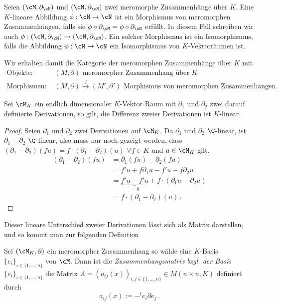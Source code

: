 \begin{defn}
Seien $(\cM,\partial_\cM)$ und $(\cN,\partial_\cN)$ zwei meromorphe
Zusammenhänge über $K$. Eine $K$-lineare Abbildung $\phi:\cM\rightarrow\cN$
ist ein Morphismus von meromorphen Zusammenhängen, falls sie
$\phi\circ\partial_\cM=\phi\circ\partial_\cN$ erfüllt. In diesem Fall
schreiben wir auch $\phi:(\cM,\partial_\cM)\rightarrow(\cN,\partial_\cN)$.
Ein solcher Morphismus ist ein Isomorphismus, falls die Abbildung
$\phi:\cM\rightarrow\cN$ ein Isomorphismus von $K$-Vektorräumen ist.
\end{defn}

\begin{comment}
TODO: entfernen
\end{comment}
\begin{defn}
Wir erhalten damit die Kategorie der meromorphen Zusammenhänge über $K$ mit
\begin{align*}
\text{Objekte: } & (M,\partial)\text{ meromorpher Zusammenhang über }K
\\\text{Morphismen: } & (M,\partial)\overset{f}{\rightarrow}(M',\partial')
  \text{ Morphismus von meromorphen Zusammenhängen.}
\end{align*}
\end{defn}

\begin{lem} Sei $\cM_K$ ein endlich dimensionaler $K$-Vektor Raum mit
$\partial_1$ und $\partial_2$ zwei darauf definierte Derivationen, so gilt, die
Differenz zweier Derivationen ist $K$-linear.
\end{lem}
\begin{proof}
Seien $\partial_1$ und $\partial_2$ zwei Derivationen auf $\cM_K$.
Da $\partial_1$ und $\partial_2$ $\C$-linear, ist $\partial_1-\partial_2$
$\C$-linear, also muss nur noch gezeigt werden, dass
$(\partial_1-\partial_2)(fu)=f\cdot(\partial_1-\partial_2)(u)$ $\forall f\in
K$ und $u\in\cM_K$ gilt.\\
\begin{align*}
(\partial_1-\partial_2)(fu) &= \partial_1(fu)-\partial_2(fu)\\
&= f'u+f\partial_1u-f'u-f\partial_2u\\
&= \underset{=0}{\underbrace{f'u-f'u}}+f\cdot(\partial_1u-\partial_2u)\\
&= f\cdot(\partial_1-\partial_2)(u) \,.
\end{align*}
\end{proof}
Dieser lineare Unterschied zweier Derivationen lässt sich als Matrix
darstellen, und so kommt man zur folgenden Definition
\begin{comment}
\cite[Seite 129]{hotta2007d}
\end{comment}
\begin{defn}[Zusammenhangsmatrix]
Sei $(\cM_K,\partial)$ ein meromorpher Zusammenhang so wähle eine $K$-Basis
$\{e_i\}_{i\in\{1,\dots,n\}}$ von $\cM$. Dann ist die
\emph{Zusammenhangsmatrix bzgl. der Basis $\{e_i\}_{i\in\{1,\dots,n\}}$} die
Matrix $A=(a_{ij}(x))_{i,j\in\{1,\dots,n\}}\in M(n\times n,K)$ definiert
durch
\[ 
a_{ij}(x) := -^te_i \partial e_j \,. 
\]
\end{defn}

